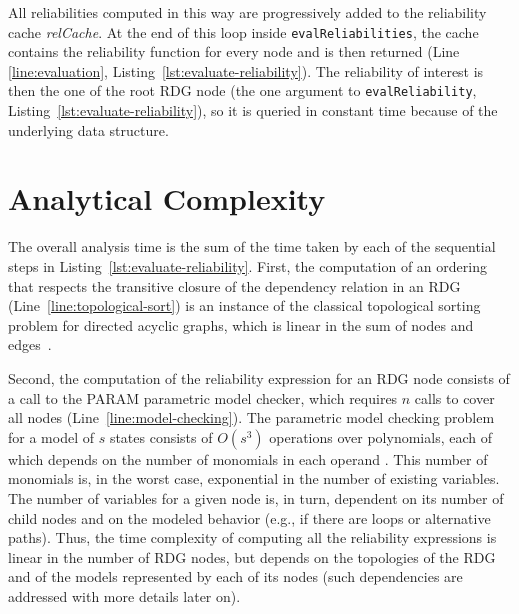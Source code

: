 All reliabilities computed in this way are progressively added to the
reliability cache \emph{relCache}. At the end of this loop inside
\texttt{evalReliabilities}, the cache contains the reliability function for
every node and is then returned (Line \ref{line:evaluation},
Listing~\ref{lst:evaluate-reliability}). The reliability of interest is then the
one of the root RDG node (the one argument to \texttt{evalReliability},
Listing~\ref{lst:evaluate-reliability}), so it is queried in constant time
because of the underlying data structure.





\section{Analytical Complexity \label{subsec:analyticalComplexity}}

The overall analysis time is the sum of the time taken by each of the sequential
steps in Listing~\ref{lst:evaluate-reliability}.  First, the computation of an
ordering that respects the transitive closure of the dependency relation in an
RDG (Line~\ref{line:topological-sort}) is an instance of the classical
topological sorting problem for directed acyclic graphs, which is linear in the
sum of nodes and edges~\citep{CormenAlgorithms}.

Second, the computation of the reliability expression for an RDG node consists
of a call to the PARAM parametric model checker, which requires $n$ calls to
cover all nodes (Line~\ref{line:model-checking}).  The parametric model checking
problem for a model of $s$ states consists of $O(s^3)$ operations over
polynomials, each of which depends on the number of monomials in each operand
\cite{HahnHZ10}.  This number of monomials is, in the worst case, exponential in
the number of existing variables.  The number of variables for a given node is,
in turn, dependent on its number of child nodes and on the modeled behavior
(e.g., if there are loops or alternative paths).  Thus, the time complexity of
computing all the reliability expressions is linear in the number of RDG nodes,
but depends on the topologies of the RDG and of the models represented by each
of its nodes (such dependencies are addressed with more details later on).

